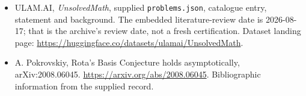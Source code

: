 \documentclass[11pt,a4paper]{article}
\begin{document}
{\small

\begin{itemize}

\item[\hypertarget{source:statement:1}{S1}] ULAM.AI, \emph{UnsolvedMath}, supplied \texttt{problems.json}, catalogue entry, statement and background. The embedded literature-review date is 2026-08-17; that is the archive’s review date, not a fresh certification. Dataset landing page: \url{https://huggingface.co/datasets/ulamai/UnsolvedMath}.

\item[\hypertarget{source:statement:2}{S2}] A. Pokrovskiy, Rota's Basis Conjecture holds asymptotically, arXiv:2008.06045. \url{https://arxiv.org/abs/2008.06045}. Bibliographic information from the supplied record.

\end{itemize}

}

\label{end:statement}
\end{document}
